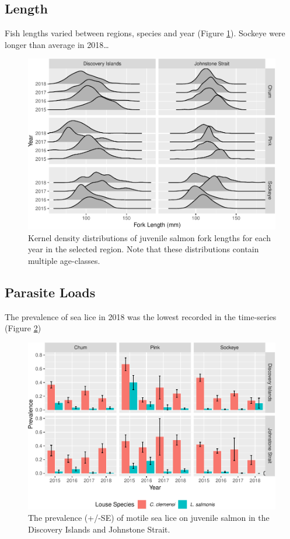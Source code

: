 \documentclass[fleqn,10pt]{wlpeerj} %
\begin{document}
\subsection*{Length}\label{length}

Fish lengths varied between regions, species and year (Figure
\ref{fig:length}). Sockeye were longer than average in 2018\ldots{}

\begin{figure}
\includegraphics[width=0.8\linewidth]{peer_j_migration_dynamics_files/figure-latex/length-1} \caption{Kernel density distributions of juvenile salmon fork lengths for each year in the selected region. Note that these distributions contain multiple age-classes.}\label{fig:length}
\end{figure}

\subsection*{Parasite Loads}\label{parasite-loads}

The prevalence of sea lice in 2018 was the lowest recorded in the
time-series (Figure \ref{fig:sealice})

\begin{figure}
\includegraphics[width=0.8\linewidth]{peer_j_migration_dynamics_files/figure-latex/sealice-1} \caption{The prevalence (+/-SE) of motile sea lice on juvenile salmon in the Discovery Islands and Johnstone Strait.}\label{fig:sealice}
\end{figure}
\end{document}
